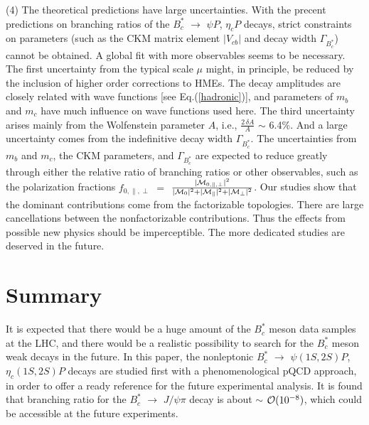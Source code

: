 \documentclass[preprint,superscriptaddress,nofootinbib]{revtex4}
\begin{document}
  (4)
  The theoretical predictions have large uncertainties.
  With the precent predictions on branching ratios of the
  $B_{c}^{\ast}$ ${\to}$ ${\psi}P$, ${\eta}_{c}P$ decays,
  strict constraints on parameters (such as the CKM matrix element
  ${\vert}V_{cb}{\vert}$ and decay width ${\Gamma}_{B_{c}^{\ast}}$)
  cannot be obtained. A global fit with more observables
  seems to be necessary.
  The first uncertainty from the typical scale ${\mu}$ might, in principle,
  be reduced by the inclusion of higher order corrections to HMEs.
  The decay amplitudes are closely related with wave functions
  [see Eq.(\ref{hadronic})], and parameters of $m_{b}$ and $m_{c}$ have much
  influence on wave functions used here.
  The third uncertainty arises mainly from the Wolfenstein parameter $A$,
  i.e., $\frac{2\,{\delta}A}{A}$ ${\sim}$ 6.4\%.
  And a large uncertainty comes from the indefinitive decay width
  ${\Gamma}_{B_{c}^{\ast}}$.
  The uncertainties from $m_{b}$ and $m_{c}$, the CKM parameters,
  and ${\Gamma}_{B_{c}^{\ast}}$ are expected to reduce greatly through
  either the relative ratio of branching ratios or other observables,
  such as the polarization fractions
  $f_{0,{\parallel},{\perp}}$ $=$ $\frac{ {\vert}{\cal M}_{0,{\parallel},{\perp}}{\vert}^{2} }
  { {\vert}{\cal M}_{0}{\vert}^{2}+{\vert}{\cal M}_{\parallel}{\vert}^{2}+{\vert}{\cal M}_{\perp}{\vert}^{2} }$.
  Our studies show that %
  the dominant contributions come from the factorizable topologies.
  There are large cancellations between the nonfactorizable contributions.
  Thus the effects from possible new physics should be imperceptible.
  The more dedicated studies are deserved in the future.

  \section{Summary}
  \label{sec04}
  It is expected that there would be a huge amount of the $B_{c}^{\ast}$ meson
  data samples  at the LHC, and there would be a realistic possibility to search for the
  $B_{c}^{\ast}$ meson weak decays in the future.
  In this paper, the nonleptonic $B_{c}^{\ast}$ ${\to}$
  ${\psi}(1S,2S)P$, ${\eta}_{c}(1S,2S)P$ decays are studied first with a
  phenomenological pQCD approach, in order to offer a ready
  reference for the future experimental analysis.
  It is found that branching ratio for the $B_{c}^{\ast}$ ${\to}$
  $J/{\psi}{\pi}$ decay is about ${\sim}$ ${\cal O}(10^{-8})$,
  which could be accessible at the future experiments.
\end{document}
